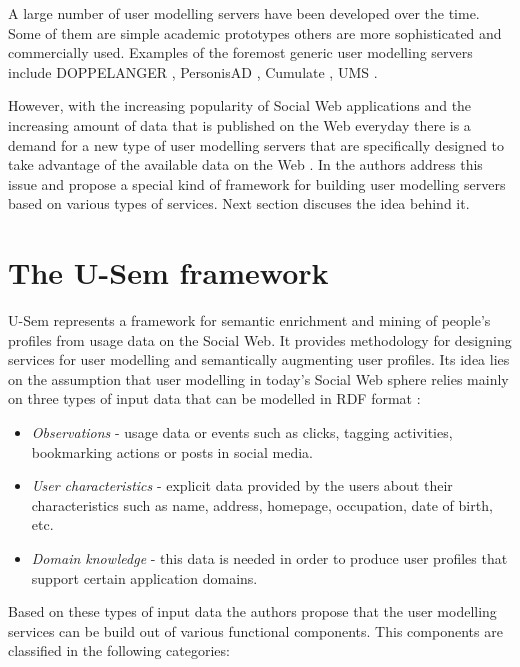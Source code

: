 A large number of user modelling servers have been developed over the time. Some of them are simple academic prototypes others are more sophisticated and commercially used. Examples of the foremost generic user modelling servers include DOPPELANGER \cite{orwant1994heterogeneous}, PersonisAD \cite{assad2007personisad}, Cumulate \cite{brusilovsky2004knowledgetree}, UMS \cite{kobsa2006ldap}.

However, with the increasing popularity of Social Web applications and the increasing amount of data that is published on the Web everyday there is a demand for a new type of user modelling servers that are specifically designed to take advantage of the available data on the Web \cite{brusilovsky2007adaptive}. In \cite{abel2011u} the authors address this issue and propose a special kind of framework for building user modelling servers based on various types of services. Next section discuses the idea behind it.

\section{The U-Sem framework}
\label{sec:usemFrm}

U-Sem represents a framework for semantic enrichment and mining of people's profiles from usage data on the Social Web. It provides methodology for designing services for user modelling and semantically augmenting user profiles. Its idea lies on the assumption that user modelling in today's Social Web sphere relies mainly on three types of input data \cite{abel2011u} that can be modelled in RDF format \cite{miller1998introduction}:

\begin{itemize}
	\item \textit{Observations} - usage data or events such as clicks, tagging activities, bookmarking actions or posts in social media.
	
	\item \textit{User characteristics} - explicit data provided by the users about their characteristics such as name, address, homepage, occupation, date of birth, etc.
	
	\item \textit{Domain knowledge} - this data is needed in order to produce user profiles that support certain application domains.
\end{itemize}

Based on these types of input data the authors propose that the user modelling services can be build out of various functional components. This components are classified in the following categories:

